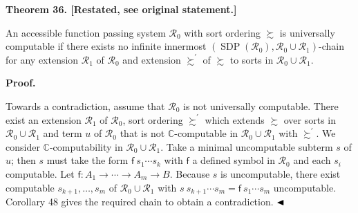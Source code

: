  
 
 
\par\medskip\noindent\textbf{Theorem 36. [Restated, see original statement.]}\par
 
 
An accessible function passing system $\mathcal{R}_{0}$ with sort ordering $\succsim$ is universally computable if there exists no infinite innermost $(\operatorname{SDP}(\mathcal{R}_{0}),\mathcal{R}_{0}\cup\mathcal{R}_{1})$-chain for any extension $\mathcal{R}_{1}$ of $\mathcal{R}_{0}$ and extension $\succsim^{\prime}$ of $\succsim$ to sorts in $\mathcal{R}_{0}\cup\mathcal{R}_{1}$.\par
 
 
 
 
 
 
\par\medskip\noindent\textbf{Proof.}\par
 
 
Towards a contradiction, assume that $\mathcal{R}_{0}$ is not universally computable. There exist an extension $\mathcal{R}_{1}$ of $\mathcal{R}_{0}$, sort ordering $\succsim^{\prime}$ which extends $\succsim$ over sorts in $\mathcal{R}_{0}\cup\mathcal{R}_{1}$ and term $u$ of $\mathcal{R}_{0}$ that is not $\mathbb{C}$-computable in $\mathcal{R}_{0}\cup\mathcal{R}_{1}$ with $\succsim^{\prime}$. We consider $\mathbb{C}$-computability in $\mathcal{R}_{0}\cup\mathcal{R}_{1}$. Take a minimal uncomputable subterm $s$ of $u$; then $s$ must take the form ${\mathsf{f}}\ {{s}_{1}\cdots{s}_{k}}$ with $\mathsf{f}$ a defined symbol in $\mathcal{R}_{0}$ and each $s_{i}$ computable. Let $\mathsf{f}:{A}_{1}\rightarrow\cdots\rightarrow{A}_{m}\rightarrow B$. Because $s$ is uncomputable, there exist computable ${s}_{k+1},\ldots,{s}_{m}$ of $\mathcal{R}_{0}\cup\mathcal{R}_{1}$ with ${s}\ {{s}_{k+1}\cdots{s}_{m}}={\mathsf{f}}\ {{s}_{1}\cdots{s}_{m}}$ uncomputable. Corollary 48 gives the required chain to obtain a contradiction. $\hfill\blacktriangleleft$\par
 
 
 
\par
 
 
 
 
